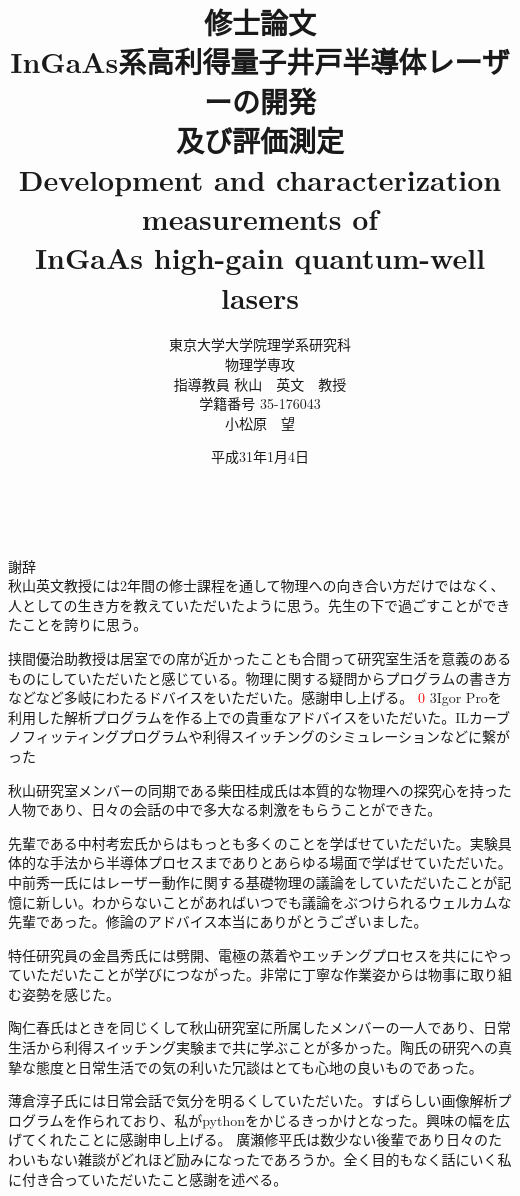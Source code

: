 \documentclass[11pt,dvipdfmx]{jreport}
\title{
{\LARGE 修士論文\\[1cm]}
{\huge InGaAs系高利得量子井戸半導体レーザーの開発\\及び評価測定\\[1cm]
Development and characterization measurements of \\InGaAs high-gain quantum-well
lasers\\[5cm]}
}
\date{\LARGE 平成31年1月4日}
\author{\LARGE 東京大学大学院理学系研究科\\
\LARGE 物理学専攻\\[1cm]
\LARGE 指導教員 秋山　英文　教授\\[1cm]
\LARGE 学籍番号 35-176043\\
\LARGE 小松原　望}
\newif\ifnoproofreadmark \noproofreadmarkfalse
\def\adsppp#1{%
 \ifnoproofreadmark%
   #1%
 \else%
  \textcolor{red}{#1}%
 \fi%
}
\begin{document}
\maketitle			%
\tableofcontents 	%
\listoffigures 		%
\listoftables　		%


謝辞\\%
秋山英文教授には2年間の修士課程を通して物理への向き合い方だけではなく、人としての生き方を教えていただいたように思う。先生の下で過ごすことができたことを誇りに思う。


挟間優治助教授は居室での席が近かったことも合間って研究室生活を意義のあるものにしていただいたと感じている。物理に関する疑問からプログラムの書き方などなど多岐にわたるドバイスをいただいた。感謝申し上げる。\adsppp03{Igor Proを利用した解析プログラムを作る上での貴重なアドバイスをいただいた。ILカーブノフィッティングプログラムや利得スイッチングのシミュレーションなどに繋がった}


秋山研究室メンバーの同期である柴田桂成氏は本質的な物理への探究心を持った人物であり、日々の会話の中で多大なる刺激をもらうことができた。


先輩である中村考宏氏からはもっとも多くのことを学ばせていただいた。実験具体的な手法から半導体プロセスまでありとあらゆる場面で学ばせていただいた。中前秀一氏にはレーザー動作に関する基礎物理の議論をしていただいたことが記憶に新しい。わからないことがあればいつでも議論をぶつけられるウェルカムな先輩であった。修論のアドバイス本当にありがとうございました。


特任研究員の金昌秀氏には劈開、電極の蒸着やエッチングプロセスを共ににやっていただいたことが学びにつながった。非常に丁寧な作業姿からは物事に取り組む姿勢を感じた。

陶仁春氏はときを同じくして秋山研究室に所属したメンバーの一人であり、日常生活から利得スイッチング実験まで共に学ぶことが多かった。陶氏の研究への真摯な態度と日常生活での気の利いた冗談はとても心地の良いものであった。


薄倉淳子氏には日常会話で気分を明るくしていただいた。すばらしい画像解析プログラムを作られており、私がpythonをかじるきっかけとなった。興味の幅を広げてくれたことに感謝申し上げる。
廣瀬修平氏は数少ない後輩であり日々のたわいもない雑談がどれほど励みになったであろうか。全く目的もなく話にいく私に付き合っていただいたこと感謝を述べる。
\end{document}
